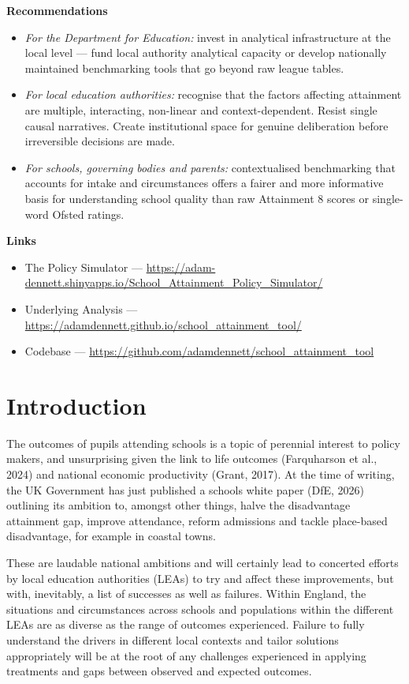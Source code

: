 \documentclass[
  11pt,
]{article}
\providecommand{\tightlist}{%
  \setlength{\itemsep}{0pt}\setlength{\parskip}{0pt}}
\begin{document}
\textbf{Recommendations}

\begin{itemize}
\tightlist
\item
  \emph{For the Department for Education:} invest in analytical
  infrastructure at the local level --- fund local authority analytical
  capacity or develop nationally maintained benchmarking tools that go
  beyond raw league tables.
\item
  \emph{For local education authorities:} recognise that the factors
  affecting attainment are multiple, interacting, non-linear and
  context-dependent. Resist single causal narratives. Create
  institutional space for genuine deliberation before irreversible
  decisions are made.
\item
  \emph{For schools, governing bodies and parents:} contextualised
  benchmarking that accounts for intake and circumstances offers a
  fairer and more informative basis for understanding school quality
  than raw Attainment 8 scores or single-word Ofsted ratings.
\end{itemize}

\textbf{Links}

\begin{itemize}
\tightlist
\item
  The Policy Simulator ---
  \url{https://adam-dennett.shinyapps.io/School_Attainment_Policy_Simulator/}
\item
  Underlying Analysis ---
  \url{https://adamdennett.github.io/school_attainment_tool/}
\item
  Codebase ---
  \url{https://github.com/adamdennett/school_attainment_tool}
\end{itemize}

\section{Introduction}\label{introduction}

The outcomes of pupils attending schools is a topic of perennial
interest to policy makers, and unsurprising given the link to life
outcomes (Farquharson et al., 2024) and national economic productivity
(Grant, 2017). At the time of writing, the UK Government has just
published a schools white paper (DfE, 2026) outlining its ambition to,
amongst other things, halve the disadvantage attainment gap, improve
attendance, reform admissions and tackle place-based disadvantage, for
example in coastal towns.

These are laudable national ambitions and will certainly lead to
concerted efforts by local education authorities (LEAs) to try and
affect these improvements, but with, inevitably, a list of successes as
well as failures. Within England, the situations and circumstances
across schools and populations within the different LEAs are as diverse
as the range of outcomes experienced. Failure to fully understand the
drivers in different local contexts and tailor solutions appropriately
will be at the root of any challenges experienced in applying treatments
and gaps between observed and expected outcomes.
\end{document}
